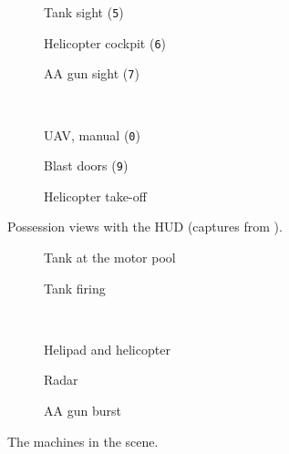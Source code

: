 \begin{figure}[h]
  \centering
  \begin{subfigure}{0.325\linewidth}\caption{Tank sight (\texttt{5})}\end{subfigure}
  \begin{subfigure}{0.325\linewidth}\caption{Helicopter cockpit (\texttt{6})}\end{subfigure}
  \begin{subfigure}{0.325\linewidth}\caption{AA gun sight (\texttt{7})}\end{subfigure}\\[1mm]
  \begin{subfigure}{0.325\linewidth}\caption{UAV, manual (\texttt{0})}\end{subfigure}
  \begin{subfigure}{0.325\linewidth}\caption{Blast doors (\texttt{9})}\end{subfigure}
  \begin{subfigure}{0.325\linewidth}\caption{Helicopter take-off}\end{subfigure}
  \caption{Possession views with the HUD (captures from ).}
  \label{fig:possess}
\end{figure}

\begin{figure}[h]
  \centering
  \begin{subfigure}{0.325\linewidth}\caption{Tank at the motor pool}\end{subfigure}
  \begin{subfigure}{0.325\linewidth}\caption{Tank firing}\end{subfigure}\\[1mm]
  \begin{subfigure}{0.325\linewidth}\caption{Helipad and helicopter}\end{subfigure}
  \begin{subfigure}{0.325\linewidth}\caption{Radar}\end{subfigure}
  \begin{subfigure}{0.325\linewidth}\caption{AA gun burst}\end{subfigure}
  \caption{The machines in the scene.}
  \label{fig:machines}
\end{figure}
